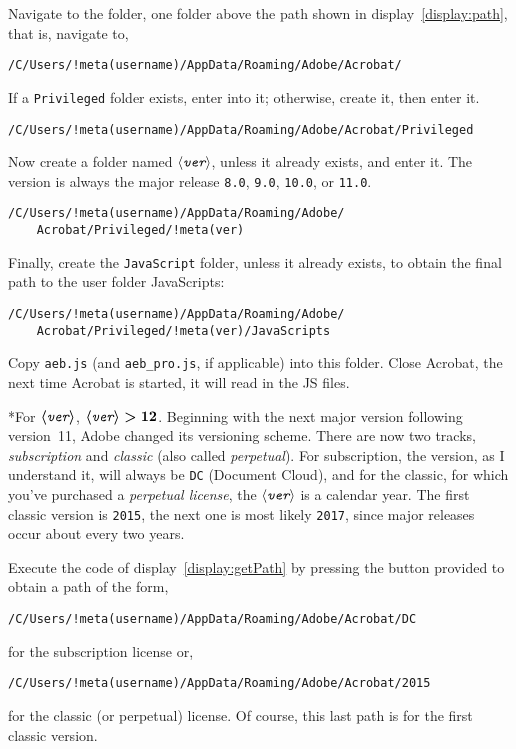\documentclass{article}
\makeatletter
\renewcommand{\paragraph}
    {\@startsection{paragraph}{4}{0pt}{6pt}{-3pt}
    {\normalfont\normalsize\bfseries}}
\def\amtIndent{\parindent}
\def\meta#1{$\langle\textit{\texttt{#1}}\rangle$}
\def\SC#1{{\small#1}}
\makeatother
\begin{document}
Navigate to the folder, one folder above the path shown in
display~\eqref{display:path}, that is, navigate to,
\begin{Verbatim}[xleftmargin=\amtIndent,fontsize=\small,commandchars=!()]
/C/Users/!meta(username)/AppData/Roaming/Adobe/Acrobat/
\end{Verbatim}
If a \texttt{Privileged} folder exists, enter into it; otherwise, create
it, then enter it.
\begin{Verbatim}[xleftmargin=\amtIndent,fontsize=\small,commandchars=!()]
/C/Users/!meta(username)/AppData/Roaming/Adobe/Acrobat/Privileged
\end{Verbatim}
Now create a folder named \meta{ver}, unless it already exists, and enter
it. The version is always the major release \texttt{8.0}, \texttt{9.0},
\texttt{10.0}, or \texttt{11.0}.
\begin{Verbatim}[xleftmargin=\amtIndent,fontsize=\small,commandchars=!()]
/C/Users/!meta(username)/AppData/Roaming/Adobe/
    Acrobat/Privileged/!meta(ver)
\end{Verbatim}
Finally, create the \texttt{JavaScript} folder, unless it already exists,
to obtain the final path to the user folder JavaScripts:
\begin{Verbatim}[xleftmargin=\amtIndent,fontsize=\small,commandchars=!()]
/C/Users/!meta(username)/AppData/Roaming/Adobe/
    Acrobat/Privileged/!meta(ver)/JavaScripts
\end{Verbatim}
Copy \texttt{aeb.js} (and \texttt{aeb\_pro.js}, if applicable) into this
folder. Close \textsf{Acrobat}, the next time \textsf{Acrobat} is started,
it will read in the \SC{JS} files.

\paragraph*{{\Stepiii}For $\boldmath\text{\meta{ver}}$, $\boldmath
\text{\meta{ver}} > 12 $.} Beginning with the next major version following
version~11, Adobe changed its versioning scheme. There are now two tracks,
\emph{subscription} and \emph{classic} (also called \emph{perpetual}). For
subscription, the version, as I understand it, will always be \texttt{DC}
(Document Cloud), and for the classic, for which you've purchased a
\emph{perpetual license}, the \meta{ver} is a calendar year. The first
classic version is \texttt{2015}, the next one is most likely \texttt{2017},
since major releases occur about every two years.

Execute the code of display~\eqref{display:getPath} by pressing the button
provided to obtain a path of the form,
\begin{Verbatim}[xleftmargin=\amtIndent,fontsize=\small,commandchars=!()]
/C/Users/!meta(username)/AppData/Roaming/Adobe/Acrobat/DC
\end{Verbatim}
for the subscription license or,
\begin{Verbatim}[xleftmargin=\amtIndent,fontsize=\small,commandchars=!()]
/C/Users/!meta(username)/AppData/Roaming/Adobe/Acrobat/2015
\end{Verbatim}
for the classic (or perpetual) license. Of course, this last path is for
the first classic version.
\end{document}

